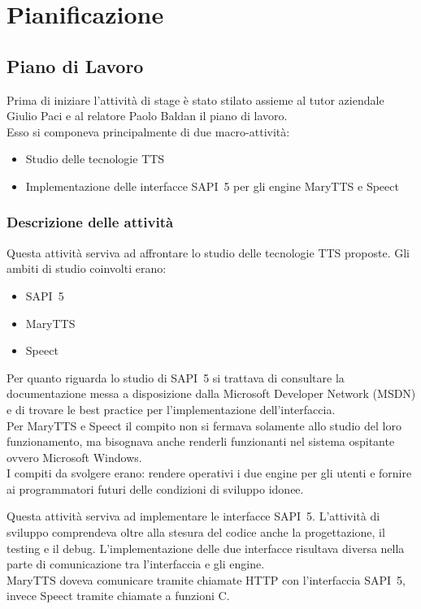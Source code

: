 \chapter{Pianificazione} %
\thispagestyle{empty}

\newpage
\section{Piano di Lavoro}
Prima di iniziare l'attività di stage è stato stilato assieme al tutor aziendale Giulio Paci e al relatore Paolo Baldan il piano di lavoro.\\
Esso si componeva principalmente di due macro-attività:
\begin{itemize}
	\item Studio delle tecnologie TTS
	\item Implementazione delle interfacce SAPI~5 per gli engine MaryTTS e Speect
\end{itemize}

\subsection{Descrizione delle attività}

\begin{description}[style=unboxed]
	\item[Studio delle tecnologie TTS] Questa attività serviva ad affrontare lo studio delle tecnologie TTS proposte. Gli ambiti di studio coinvolti erano:
	\begin{itemize}
		\item SAPI~5
		\item MaryTTS
		\item Speect
	\end{itemize}
	Per quanto riguarda lo studio di SAPI~5 si trattava di consultare la documentazione messa a disposizione dalla Microsoft Developer Network (MSDN) e di trovare le best practice per l'implementazione dell'interfaccia.\\
	Per MaryTTS e Speect il compito non si fermava solamente allo studio del loro funzionamento, ma bisognava anche renderli funzionanti nel sistema ospitante ovvero Microsoft Windows.\\
	I compiti da svolgere erano: rendere operativi i due engine per gli utenti e fornire ai programmatori futuri delle condizioni di sviluppo idonee.
	
	\item[Implementazione delle interfacce SAPI~5 per gli engine MaryTTS e Speect]
	Questa attività serviva ad implementare le interfacce SAPI~5. L'attività di sviluppo comprendeva oltre alla stesura del codice anche la progettazione, il testing e il debug.
	L'implementazione delle due interfacce risultava diversa nella parte di comunicazione tra l'interfaccia e gli engine.\\
	MaryTTS doveva comunicare tramite chiamate HTTP con l'interfaccia SAPI~5, invece Speect tramite chiamate a funzioni C.  
\end{description}

